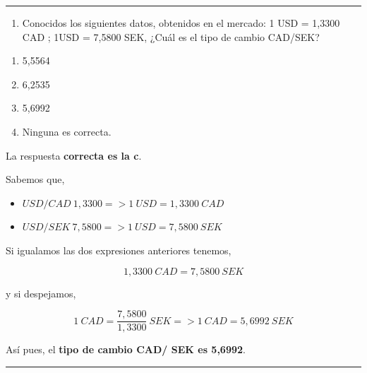 \documentclass[
  letterpaper,
  DIV=11,
  numbers=noendperiod]{scrreprt}
\providecommand{\tightlist}{%
  \setlength{\itemsep}{0pt}\setlength{\parskip}{0pt}}\usepackage{longtable,booktabs,array}
\begin{document}
\begin{center}\rule{0.5\linewidth}{0.5pt}\end{center}

\begin{enumerate}
\def\labelenumi{\arabic{enumi}.}
\setcounter{enumi}{46}
\tightlist
\item
  Conocidos los siguientes datos, obtenidos en el mercado: 1 USD =
  1,3300 CAD ; 1USD = 7,5800 SEK, ¿Cuál es el tipo de cambio CAD/SEK?
\end{enumerate}

\begin{enumerate}
\def\labelenumi{\alph{enumi}.}
\item
  5,5564
\item
  6,2535
\item
  5,6992
\item
  Ninguna es correcta.
\end{enumerate}

\begin{tcolorbox}[enhanced jigsaw, left=2mm, opacityback=0, colback=white, breakable, arc=.35mm, bottomrule=.15mm, rightrule=.15mm, toprule=.15mm, leftrule=.75mm, colframe=quarto-callout-tip-color-frame]
\begin{minipage}[t]{5.5mm}
\textcolor{quarto-callout-tip-color}{\faLightbulb}
\end{minipage}%
\begin{minipage}[t]{\textwidth - 5.5mm}

La respuesta \textbf{correcta es la c}.

Sabemos que,

\begin{itemize}
\item
  \(USD/CAD\ 1,3300 => 1\ USD = 1,3300\ CAD\)
\item
  \(USD/SEK\ 7,5800 => 1\ USD = 7,5800\ SEK\)
\end{itemize}

Si igualamos las dos expresiones anteriores tenemos,

\[1,3300\ CAD = 7,5800\ SEK\]

y si despejamos,

\[1\ CAD = \frac{7,5800}{1,3300}\ SEK => 1\ CAD = 5,6992\ SEK\]

Así pues, el \textbf{tipo de cambio CAD/ SEK es 5,6992}.

\end{minipage}%
\end{tcolorbox}

\begin{center}\rule{0.5\linewidth}{0.5pt}\end{center}
\end{document}
